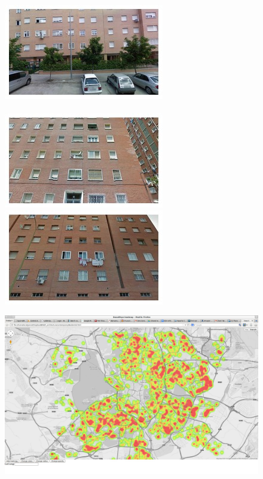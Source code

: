 \begin{figure}
\begin{minipage}{\linewidth}
\begin{minipage}{0.3\linewidth}
      \includegraphics[width=0.49\linewidth]{imgs/arch/mosaicsS3/mosaic0007.jpg}
      \\ \vspace{-3mm} \\
      \includegraphics[width=0.49\linewidth]{imgs/arch/mosaicsS3/mosaic0008.jpg}
      \includegraphics[width=0.49\linewidth]{imgs/arch/mosaicsS3/mosaic0009.jpg}
    \end{minipage}
    \begin{minipage}{0.7\linewidth}
      \includegraphics[trim= 350 150 250 150, clip=true, width=\linewidth]{imgs/arch/mapS3.jpg}

\end{minipage}
\end{minipage}
\end{figure}
